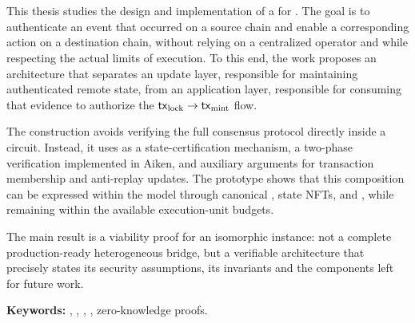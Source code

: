 \chapter*{\runtitle}

\noindent This thesis studies the design and implementation of a \zkBridge for \Cardano. The goal is to authenticate an event that occurred on a source chain and enable a corresponding action on a destination chain, without relying on a centralized operator and while respecting the actual limits of \Onchain execution. To this end, the work proposes an architecture that separates an update layer, responsible for maintaining authenticated remote state, from an application layer, responsible for consuming that evidence to authorize the $\mathsf{tx}_{\mathrm{lock}} \rightarrow \mathsf{tx}_{\mathrm{mint}}$ flow.

The construction avoids verifying the full \Cardano consensus protocol directly inside a circuit. Instead, it uses \Mithril as a state-certification mechanism, a two-phase \STM verification implemented in Aiken, and auxiliary \Groth arguments for transaction membership and anti-replay \SMT updates. The prototype shows that this composition can be expressed within the \eUTxO model through canonical \UTxOs, state NFTs, \ReferenceScripts and \ProofReceipt, while remaining within the available execution-unit budgets.

The main result is a viability proof for an isomorphic \Cardano instance: not a complete production-ready heterogeneous bridge, but a verifiable architecture that precisely states its security assumptions, its \Onchain invariants and the components left for future work.

\bigskip

\noindent\textbf{Keywords:} \zkBridge, \Cardano, \Mithril, \eUTxO, zero-knowledge proofs.
